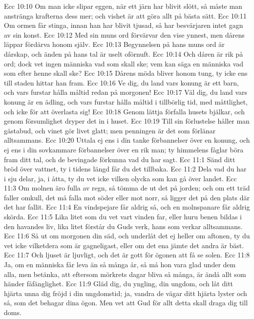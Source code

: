 Ecc 10:10  Om man icke slipar eggen, när ett järn har blivit slött, så måste man anstränga krafterna dess mer; och vishet är att göra allt på bästa sätt.
Ecc 10:11  Om ormen får stinga, innan han har blivit tjusad, så har besvärjaren intet gagn av sin konst.
Ecc 10:12  Med sin muns ord förvärvar den vise ynnest, men dårens läppar fördärva honom själv.
Ecc 10:13  Begynnelsen på hans muns ord är dårskap, och änden på hans tal är uselt oförnuft.
Ecc 10:14  Och dåren är rik på ord; dock vet ingen människa vad som skall ske; vem kan säga en människa vad som efter henne skall ske?
Ecc 10:15  Dårens möda bliver honom tung, ty icke ens till staden hittar han fram.
Ecc 10:16  Ve dig, du land vars konung är ett barn, och vars furstar hålla måltid redan på morgonen!
Ecc 10:17  Väl dig, du land vars konung är en ädling, och vars furstar hålla måltid i tillbörlig tid, med måttlighet, och icke för att överlasta sig!
Ecc 10:18  Genom lättja förfalla husets bjälkar, och genom försumlighet dryper det in i huset.
Ecc 10:19  Till sin förlustelse håller man gästabud, och vinet gör livet glatt; men penningen är det som förlänar alltsammans.
Ecc 10:20  Uttala ej ens i din tanke förbannelser över en konung, och ej ens i din sovkammare förbannelser över en rik man; ty himmelens fåglar böra fram ditt tal, och de bevingade förkunna vad du har sagt.
Ecc 11:1  Sänd ditt bröd över vattnet, ty i tidens längd får du det tillbaka.
Ecc 11:2  Dela vad du har i sju delar, ja, i åtta, ty du vet icke vilken olycka som kan gå över landet.
Ecc 11:3  Om molnen äro fulla av regn, så tömma de ut det på jorden; och om ett träd faller omkull, det må falla mot söder eller mot norr, så ligger det på den plats där det har fallit.
Ecc 11:4  En vindspejare får aldrig så, och en molnspanare får aldrig skörda.
Ecc 11:5  Lika litet som du vet vart vinden far, eller huru benen bildas i den havandes liv, lika litet förstår du Guds verk, hans som verkar alltsammans.
Ecc 11:6  Så ut om morgonen din säd, och underlåt det ej heller om aftonen, ty du vet icke vilketdera som är gagneligast, eller om det ena jämte det andra är bäst.
Ecc 11:7  Och ljuset är ljuvligt, och det är gott för ögonen att få se solen.
Ecc 11:8  Ja, om en människa får leva än så många år, så må hon vara glad under dem alla, men betänka, att eftersom mörkrets dagar bliva så många, är ändå allt som händer fåfänglighet.
Ecc 11:9  Gläd dig, du yngling, din ungdom, och låt ditt hjärta unna dig fröjd i din ungdomstid; ja, vandra de vägar ditt hjärta lyster och så, som det behagar dina ögon. Men vet att Gud för allt detta skall draga dig till doms.
